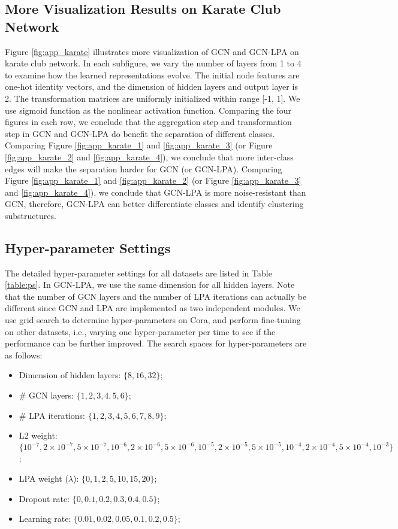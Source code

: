 \documentclass{article}
\begin{document}
	
	\subsection{More Visualization Results on Karate Club Network}
	\label{app:e}
		Figure \ref{fig:app_karate} illustrates more visualization of GCN and GCN-LPA on karate club network.
		In each subfigure, we vary the number of layers from 1 to 4 to examine how the learned representations evolve.
The initial node features are one-hot identity vectors, and the dimension of hidden layers and output layer is 2.
		The transformation matrices are uniformly initialized within range [-1, 1].
		We use sigmoid function as the nonlinear activation function.
		Comparing the four figures in each row, we conclude that the aggregation step and transformation step in GCN and GCN-LPA do benefit the separation of different classes.
		Comparing Figure \ref{fig:app_karate_1} and \ref{fig:app_karate_3} (or Figure \ref{fig:app_karate_2} and \ref{fig:app_karate_4}), we conclude that more inter-class edges will make the separation harder for GCN (or GCN-LPA).		Comparing Figure \ref{fig:app_karate_1} and \ref{fig:app_karate_2} (or Figure \ref{fig:app_karate_3} and \ref{fig:app_karate_4}), we conclude that GCN-LPA is more noise-resistant than GCN, therefore, GCN-LPA can better differentiate classes and identify clustering substructures.
		
		
	\subsection{Hyper-parameter Settings}
	\label{app:f}
		The detailed hyper-parameter settings for all datasets are listed in Table \ref{table:ps}.
		In GCN-LPA, we use the same dimension for all hidden layers.
		Note that the number of GCN layers and the number of LPA iterations can actually be different since GCN and LPA are implemented as two independent modules.
		We use grid search to determine hyper-parameters on Cora, and perform fine-tuning on other datasets, i.e., varying one hyper-parameter per time to see if the performance can be further improved.
		The search spaces for hyper-parameters are as follows:
		\begin{itemize}
			\item Dimension of hidden layers: $\{8, 16, 32\}$;
			\item \# GCN layers: $\{1, 2, 3, 4, 5, 6\}$;
			\item \# LPA iterations: $\{1, 2, 3, 4, 5, 6, 7, 8, 9\}$;
			\item L2 weight: $\{ 10^{-7}, 2 \times 10^{-7}, 5 \times 10^{-7}, 10^{-6}, 2 \times 10^{-6}, 5 \times 10^{-6}, 10^{-5}, 2 \times 10^{-5}, 5 \times 10^{-5}, 10^{-4}, 2 \times 10^{-4}, 5 \times 10^{-4}, 10^{-3} \}$;
			\item LPA weight ($\lambda$): $\{0, 1, 2, 5, 10, 15, 20 \}$;
			\item Dropout rate: $\{0, 0.1, 0.2, 0.3, 0.4, 0.5\}$;
			\item Learning rate: $\{0.01, 0.02, 0.05, 0.1, 0.2, 0.5\}$;
		\end{itemize}
		
\end{document}

